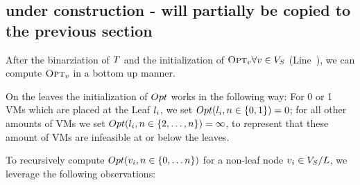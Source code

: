 
\subsection{under construction - will partially be copied to the previous 
section}

After the binarziation of $T$ and the initialization of 
$\textsc{Opt}_{v} \forall v \in V_S$ 
(Line~), we can compute $\textsc{Opt}_{v}$ in a bottom up 
manner. 

On the leaves the initialization of $Opt$ works in the following way: For 0 or 
1 VMs which are placed at the Leaf $l_i$, we set $Opt(l_i, n \in 
\{0,1\}) = 0$; for all other amounts of VMs we set $Opt(l_i, n \in 
\{2,\dots,n\}) = \infty$, to represent that these amount of VMs are 
infeasible at or below the leaves.

To recursively compute $Opt(v_i, n \in \{0,\dots n\})$ for a 
non-leaf node $v_i \in V_S / L$, we leverage the 
following observations: 

